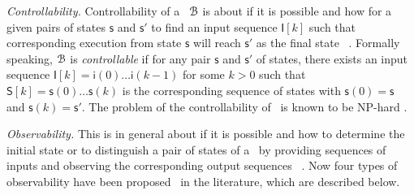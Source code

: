 

\smallskip\noindent
{\em Controllability.}  Controllability of a  \BCN\ ${\mathcal{B}}$  is  about if it is possible and how for a given pairs of states $\mathsf{s}$ and $\mathsf{s}'$  to find an input  sequence $\mathsf{I}[k]$  such that  corresponding execution from state $\mathsf{s}$ will reach $\mathsf{s}'$ as the final state ~\cite{Akutsu2007Control}. Formally speaking, ${\mathcal{B}}$ is {\em controllable} 
if for any pair $\mathsf{s}$ and $\mathsf{s}'$ of states, there  exists an input sequence $\mathsf{I}[k]=\mathsf{i}(0)\ldots\mathsf{i}(k-1)$ for some $k>0$ such that $\mathsf{S}[k]=\mathsf{s}(0)\ldots\mathsf{s}(k)$ is the corresponding sequence of states with $\mathsf{s}(0) =\mathsf{s}$ and $\mathsf{s}(k)=\mathsf{s}'$. The  problem of the controllability of \BCNs\ is known to be {NP}-hard \cite{Akutsu2007Control}. %
%

\smallskip\noindent
{\em Observability.} This is in general about if it is possible and how to determine the initial state or to distinguish a pair of states of a \BCN\   by providing sequences of inputs and observing the corresponding output sequences ~\cite{cheng2009controllability}. Now four types of observability have been proposed~\cite{Zhang2016Observability} in the literature, which are described below.



